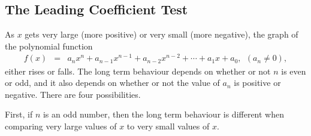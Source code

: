 
\subsection{The Leading Coefficient Test}

As $x$ gets very large (more positive) or very small (more negative),
the graph of the polynomial function
\begin{eqnarray}
  \label{eq:2-2:generalPoly}
  f(x) & = & a_n x^n + a_{n-1} x^{n-1} + a_{n-2} x^{n-2} + \cdots +
             a_1 x + a_0, ~~(a_n \neq 0),
\end{eqnarray}
either rises or falls. The long term behaviour depends on whether or
not $n$ is even or odd, and it also depends on whether or not the
value of $a_n$ is positive or negative. There are four possibilities.

First, if $n$ is an odd number, then the long term behaviour is
different when comparing very large values of $x$ to very small values
of $x$.

